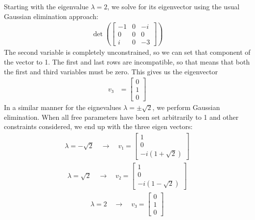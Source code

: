 Starting with the eigenvalue $λ=2$, we solve for its eigenvector using the
usual Gaussian elimination approach:
\begin{align*}
    \det ( \begin{bmatrix}
	-1  & 0   & -i   \\
	0   & 0   & 0    \\
	i   & 0   & -3
    \end{bmatrix} )
\end{align*}
The second variable is completely unconstrained, so we can set that component
of the vector to 1. The first and last rows are incompatible, so that means
that both the first and third variables must be zero. This gives us the
eigenvector
\begin{align*}
    v₃ &= \begin{bmatrix} 0 \\ 1 \\ 0 \end{bmatrix}
\end{align*}
In a similar manner for the eignevalues $λ = ±\sqrt 2$, we perform Gaussian
elimination. When all free parameters have been set arbitrarily to 1 and other
constraints considered, we end up with the three eigen vectors:
\begin{align}
    \boxed{ λ = -\sqrt 2 \quad\rightarrow\quad v₁ =
	\begin{bmatrix} 1 \\ 0 \\ -i(1+\sqrt 2) \end{bmatrix} }
\end{align}
\begin{align}
    \boxed{ λ = \sqrt2 \quad\rightarrow\quad v₂ =
	\begin{bmatrix} 1 \\ 0 \\ -i(1-\sqrt 2) \end{bmatrix} }
\end{align}
\begin{align}
    \boxed{ λ = 2 \quad\rightarrow\quad v₃ =
	\begin{bmatrix} 0 \\ 1 \\ 0 \end{bmatrix} }
\end{align}
